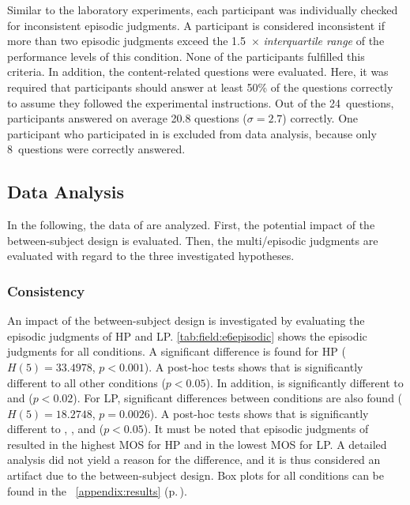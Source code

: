 Similar to the laboratory experiments, each participant was individually checked for inconsistent episodic judgments.
A participant is considered inconsistent if more than two episodic judgments exceed the 1.5~$\times$ \emph{interquartile range} of the performance levels of this condition.
None of the participants fulfilled this criteria.
In addition, the content-related questions were evaluated.
Here, it was required that participants should answer at least 50\% of the questions correctly to assume they followed the experimental instructions.
Out of the 24~questions, participants answered on average 20.8 questions ($\sigma = 2.7$) correctly.
One participant who participated in  is excluded from data analysis, because only 8~questions were correctly answered.



\subsection{Data Analysis}
In the following, the data of  are analyzed.
First, the potential impact of the between-subject design is evaluated.
Then, the multi\-/episodic judgments are evaluated with regard to the three investigated hypotheses.

\subsubsection{Consistency}
An impact of the between-subject design is investigated by evaluating the episodic judgments of \ac{HP} and \ac{LP}.
\autoref{tab:field:e6episodic} shows the episodic judgments for all conditions.
A significant difference is found for \ac{HP} ($H(5)=33.4978$, $p<0.001$).
A post-hoc tests shows that  is significantly different to all other conditions ($p<0.05$). %
In addition,  is significantly different to  and  ($p<0.02$).
For \ac{LP}, significant differences between conditions are also found ($H(5)=18.2748$, $p=0.0026$).
A post-hoc tests shows that  is significantly different to , , and  ($p<0.05$). %
It must be noted that episodic judgments of  resulted in the highest \ac{MOS} for \ac{HP} and in the lowest \ac{MOS} for \ac{LP}.
A detailed analysis did not yield a reason for the difference, and it is thus considered an artifact due to the between-subject design.
Box plots for all conditions can be found in the \appendix{}~\ref{appendix:results} (p.\,\pageref{appendix:results}).

